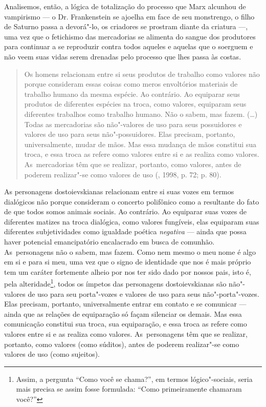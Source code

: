 Analisemos, então, a lógica de totalização do processo que Marx alcunhou
de vampirismo --- o Dr. Frankenstein se ajoelha em face de seu
monstrengo, o filho de Saturno passa a devorá"-lo, os criadores se
prostram diante da criatura ---, uma vez que o fetichismo das mercadorias
se alimenta do sangue dos produtores para continuar a se reproduzir
contra todos aqueles e aquelas que o soerguem e não veem suas vidas
serem drenadas pelo processo que lhes passa às costas.

\begin{quote}
Os homens relacionam entre si seus produtos de trabalho como valores não
porque consideram essas coisas como meros envoltórios materiais de
trabalho humano da mesma espécie. Ao contrário. Ao equiparar seus
produtos de diferentes espécies na troca, como valores, equiparam seus
diferentes trabalhos como trabalho humano. Não o sabem, mas fazem. (\ldots)
Todas as mercadorias são não"-valores de uso para seus possuidores e
valores de uso para seus não"-possuidores. Elas precisam, portanto,
universalmente, mudar de mãos. Mas essa mudança de mãos constitui sua
troca, e essa troca as refere como valores entre si e as realiza como
valores. As~mercadorias têm que se realizar, portanto, como valores,
antes de poderem realizar"-se como valores de uso (, 1998, p. 72; p.
80).
\end{quote}

As personagens dostoievskianas relacionam entre si suas vozes em termos
dialógicos não porque consideram o concerto polifônico como a resultante
do fato de que todos somos animais sociais. Ao contrário. Ao equiparar
suas vozes de diferentes matizes na troca dialógica, como valores
fungíveis, elas equiparam suas diferentes subjetividades como igualdade
poética \emph{negativa} --- ainda que possa haver potencial emancipatório
encalacrado em busca de comunhão. As~personagens não o sabem, mas fazem.
Como nem mesmo o meu nome é algo em si e para si meu, uma vez que o
signo de identidade que nos é mais próprio tem um caráter fortemente
alheio por nos ter sido dado por nossos pais, isto é, pela
alteridade\footnote{Assim, a pergunta ``Como você se chama?'', em termos
  lógico"-sociais, seria mais precisa se assim fosse formulada: ``Como
  primeiramente chamaram você?''}, todos os ímpetos das personagens
dostoievskianas são não"-valores de uso para seu porta"-vozes e valores de
uso para seus não"-porta"-vozes. Elas precisam, portanto, universalmente
entrar em contato e se comunicar --- ainda que as relações de equiparação
só façam silenciar os demais. Mas essa comunicação constitui sua troca,
sua equiparação, e essa troca as refere como valores entre si e as
realiza como valores. As~personagens têm que se realizar, portanto, como
valores (como súditos), antes de poderem realizar"-se como valores de uso
(como sujeitos).

